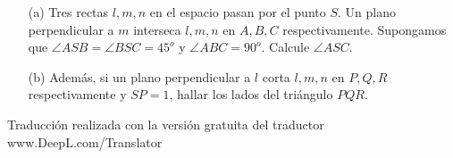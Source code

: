 \begin{enumerate}
  \item[(a)] Tres rectas $l,m,n$ en el espacio pasan por el punto $S$. Un plano perpendicular a $m$ interseca $l,m,n$ en $A,B,C$ respectivamente. Supongamos que $\angle ASB = \angle BSC = 45^o$ y $\angle ABC = 90^o$. Calcule $\angle ASC$.
  \item[(b)] Además, si un plano perpendicular a $l$ corta $l,m,n$ en $P,Q,R$ respectivamente y $SP = 1$, hallar los lados del triángulo $PQR$.
\end{enumerate}

Traducción realizada con la versión gratuita del traductor www.DeepL.com/Translator
